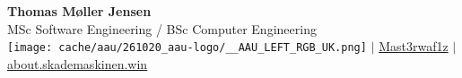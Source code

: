 \huge\textbf{Thomas Møller Jensen} \\
\tiny MSc Software Engineering / BSc Computer Engineering \\
\texttt{[image: cache/aau/261020\_aau-logo/\_\_AAU\_LEFT\_RGB\_UK.png]}
\normalsize $\mid$
\small\faGithub\hspace{4pt}\href{https://github.com/Mast3rwaf1z}{Mast3rwaf1z}
\normalsize $\mid$
\faHome\hspace{4pt}\href{https://about.skademaskinen.win}{about.skademaskinen.win}